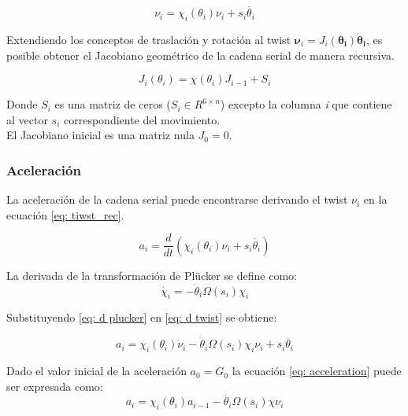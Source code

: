 \begin{equation} \label{eq: tiwst_rec}
\nu_i = \chi_i(\theta_i)\nu_i + s_i\dot{\theta_i}
\end{equation}

Extendiendo los conceptos de traslación y rotación al twist 
$\boldsymbol \nu_i = J_i(\boldsymbol{\theta_i}) \boldsymbol{\dot \theta_i}$, 
es posible obtener el Jacobiano geométrico 
de la cadena serial de manera recursiva. 

\begin{equation}
J_i(\theta_i) = \chi(\theta_i) J_{i-1} + S_i
\end{equation}

Donde $S_i$ es una matriz de ceros 
($S_i \in R^{6\times n}$) excepto la columna 
\emph{i} que contiene al vector $s_i$ correspondiente 
del movimiento.\\
El Jacobiano inicial es una matriz nula $J_0 = 0$.

\subsubsection{Aceleración}

La aceleración de la cadena serial puede 
encontrarse derivando el twist $\nu_i $ en la ecuación 
\eqref{eq: tiwst_rec}.

\begin{equation}\label{eq: d twist}
a_i = \frac{d}{dt} (\chi_i(\theta_i)\nu_i + s_i\dot{\theta_i})
\end{equation}

La derivada de la transformación de Plücker 
se define como:
\begin{equation}\label{eq: d plucker}
\dot{\chi_i} = -\dot \theta_i \Omega(s_i) \chi_i
\end{equation}

Substituyendo \eqref{eq: d plucker} 
en \eqref{eq: d twist} se obtiene: 

\begin{equation}\label{eq: acceleration}
a_i = \chi_i(\theta_i)\dot{\nu}_i - \dot \theta_i \Omega(s_i)\chi_i \nu_i+ s_i\ddot{\theta_i}
\end{equation}

Dado el valor inicial de la aceleración 
$a_0 = G_0$ 
la ecuación \eqref{eq: acceleration} 
puede ser expresada como:
\begin{equation}
a_i = \chi_i(\theta_i) a_{i-1} - \dot{\theta_i}\Omega(s_i)\chi \nu_i
\end{equation}

